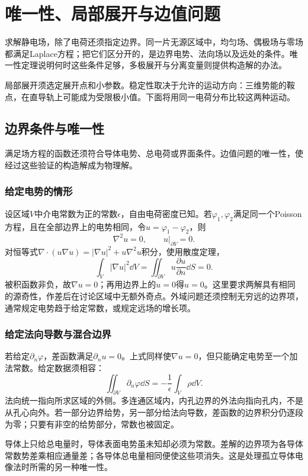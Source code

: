 \chapter{唯一性、局部展开与边值问题}\label{ch:es2}
求解静电场，除了电荷还须指定边界。同一片无源区域中，均匀场、偶极场与零场都满足Laplace方程；把它们区分开的，是边界电势、法向场以及远处的条件。唯一性定理说明何时这些条件足够，多极展开与分离变量则提供构造解的办法。

局部展开须选定展开点和小参数。稳定性取决于允许的运动方向：三维势能的鞍点，在直导轨上可能成为受限极小值。下面将用同一电荷分布比较这两种运动。


\section{边界条件与唯一性}\label{sec:es2-uniqueness}\label{sec:es2-unique}
满足场方程的函数还须符合导体电势、总电荷或界面条件。边值问题的唯一性，使经过这些验证的构造解成为物理解。

\subsection{给定电势的情形}
设区域$V$中介电常数为正的常数$\epsilon$，自由电荷密度已知。若$\varphi_1,\varphi_2$满足同一个Poisson方程，且在全部边界上的电势相同，令$u=\varphi_1-\varphi_2$，则
\[\nabla^2u=0,\qquad u|_{\partial V}=0.\]
对恒等式$\nabla\cdot(u\nabla u)=|\nabla u|^2+u\nabla^2u$积分，使用散度定理，
\[\int_V|\nabla u|^2\dd V
=\iint_{\partial V}u\frac{\partial u}{\partial n}\dd S=0.\]
被积函数非负，故$\nabla u=0$；再用边界上的$u=0$得$u=0$。这里要求两解具有相同的源奇性，作差后在讨论区域中无额外奇点。外域问题还须控制无穷远的边界项，通常规定电势趋于给定常数，或规定远场的增长项。

\subsection{给定法向导数与混合边界}
若给定$\partial_n\varphi$，差函数满足$\partial_nu=0$。上式同样使$\nabla u=0$，但只能确定电势至一个加法常数。给定数据须相容：
\[\iint_{\partial V}\partial_n\varphi\dd S
=-\frac1\epsilon\int_V\rho\dd V.\]
法向统一指向所求区域的外侧。多连通区域内，内孔边界的外法向指向孔内，不是从孔心向外。若一部分边界给势，另一部分给法向导数，差函数的边界积分仍逐段为零；只要有非空的给势部分，常数也被固定。

导体上只给总电量时，导体表面电势虽未知却必须为常数。差解的边界项为各导体常数势差乘相应通量差；各导体总电量相同便使这些项消失。这是处理孤立导体电像法时所需的另一种唯一性。

